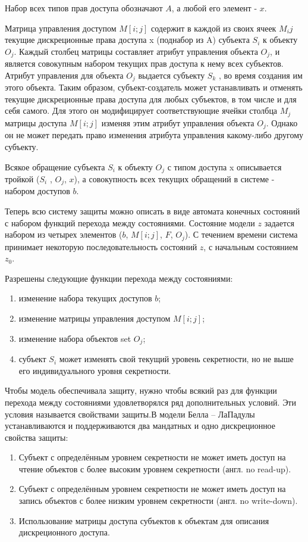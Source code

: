 Набор всех типов прав доступа обозначают $A$, а любой его элемент - $x$. 

Матрица управления доступом $M[i;j]$ содержит в каждой из своих ячеек $M_ij$ текущие дискреционные права доступа x (поднабор из A) субъекта $S_i$ к объекту $O_j$. Каждый столбец матрицы составляет атрибут управления объекта $O_j$, и является совокупным набором текущих прав доступа к нему всех субъектов. Атрибут управления для объекта $O_j$ выдается субъекту $S_k$ , во время создания им этого объекта. Таким образом, субъект-создатель может устанавливать и отменять текущие дискреционные права доступа для любых субъектов, в том числе и для себя самого. Для этого он модифицирует соответствующие ячейки столбца $M_j$ матрицы доступа $M[i;j]$ изменяя этим атрибут управления объекта $O_j$. Однако он не может передать право изменения атрибута управления какому-либо другому субъекту. 

Всякое обращение субъекта $S_i$ к объекту $O_j$ с типом доступа x описывается тройкой ($S_i$ , $O_j$, $x$), а совокупность всех текущих обращений в системе - набором доступов $b$. 

Теперь всю систему защиты можно описать в виде автомата конечных состояний с набором функций перехода между состояниями. Состояние модели $z$ задается набором из четырех элементов ($b$, $M[i;j]$, $F$,  $O_j$). С течением времени система принимает некоторую последовательность состояний $z$, с начальным состоянием $z_0$. 

Разрешены следующие функции перехода между состояниями: 

\begin{enumerate}
	\item изменение набора текущих доступов $b$; 
	\item изменение матрицы управления доступом $M[i;j]$; 
	\item изменение набора объектов set $O_j$;
	\item субъект $S_i$ может изменять свой текущий уровень секретности, но не выше его индивидуального уровня секретности. 
\end{enumerate}

Чтобы модель обеспечивала защиту, нужно чтобы всякий раз для функции перехода между состояниями удовлетворялся ряд дополнительных условий. Эти условия называется свойствами защиты.В модели Белла – ЛаПадулы устанавливаются и поддерживаются два мандатных и одно дискреционное свойства защиты\footnotemark:

\begin{enumerate}
    \item Субъект с определённым уровнем секретности не может иметь доступ на чтение объектов с более высоким уровнем секретности (англ. no read-up).
    \item Субъект с определённым уровнем секретности не может иметь доступ на запись объектов с более низким уровнем секретности (англ. no write-down).
    \item Использование матрицы доступа субъектов к объектам для описания дискреционного доступа.
\end{enumerate}

